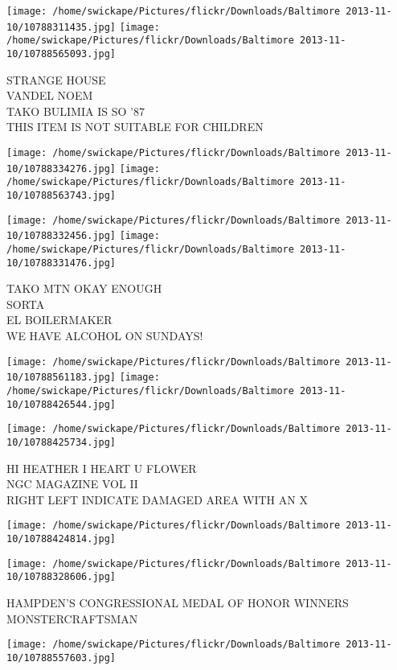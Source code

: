 \documentclass[10pt,letterpaper]{article}
\begin{document}
\texttt{[image: /home/swickape/Pictures/flickr/Downloads/Baltimore 2013-11-10/10788311435.jpg]}
\texttt{[image: /home/swickape/Pictures/flickr/Downloads/Baltimore 2013-11-10/10788565093.jpg]}

STRANGE HOUSE\\
VANDEL NOEM\\
TAKO BULIMIA IS SO '87\\
THIS ITEM IS NOT SUITABLE FOR CHILDREN
\pagebreak

\texttt{[image: /home/swickape/Pictures/flickr/Downloads/Baltimore 2013-11-10/10788334276.jpg]}
\texttt{[image: /home/swickape/Pictures/flickr/Downloads/Baltimore 2013-11-10/10788563743.jpg]}

\texttt{[image: /home/swickape/Pictures/flickr/Downloads/Baltimore 2013-11-10/10788332456.jpg]}
\texttt{[image: /home/swickape/Pictures/flickr/Downloads/Baltimore 2013-11-10/10788331476.jpg]}

TAKO MTN OKAY ENOUGH\\
SORTA\\
EL BOILERMAKER\\
WE HAVE ALCOHOL ON SUNDAYS!
\pagebreak

\texttt{[image: /home/swickape/Pictures/flickr/Downloads/Baltimore 2013-11-10/10788561183.jpg]}
\texttt{[image: /home/swickape/Pictures/flickr/Downloads/Baltimore 2013-11-10/10788426544.jpg]}

\vspace{0.25in}
\texttt{[image: /home/swickape/Pictures/flickr/Downloads/Baltimore 2013-11-10/10788425734.jpg]}

HI HEATHER I HEART U FLOWER\\
NGC MAGAZINE VOL II\\
RIGHT LEFT INDICATE DAMAGED AREA WITH AN X
\pagebreak

\texttt{[image: /home/swickape/Pictures/flickr/Downloads/Baltimore 2013-11-10/10788424814.jpg]}

\vspace{0.25in}
\texttt{[image: /home/swickape/Pictures/flickr/Downloads/Baltimore 2013-11-10/10788328606.jpg]}

HAMPDEN'S CONGRESSIONAL MEDAL OF HONOR WINNERS\\
MONSTERCRAFTSMAN
\pagebreak

\texttt{[image: /home/swickape/Pictures/flickr/Downloads/Baltimore 2013-11-10/10788557603.jpg]}
\end{document}
